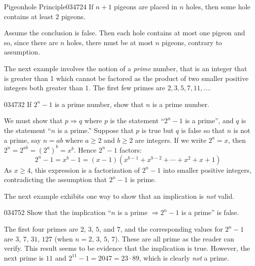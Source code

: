 \begin{example}{Pigeonhole Principle}{034724}
If $n + 1$ pigeons are placed in $n$ holes, then some hole contains at least $2$ pigeons.

\begin{solution}
  Assume the conclusion is false. Then each hole contains at most one pigeon and so, since there are $n$ holes, there must be at most $n$ pigeons, contrary to assumption.
\end{solution}
\end{example}

The next example involves the notion of a \textit{prime}
 number, that is an integer that is greater than 1 which cannot be 
factored as the product of two smaller positive integers both greater 
than $1$. The first few primes are $2, 3, 5, 7, 11, \dots$.


\begin{example}{}{034732}
If $2^n - 1$ is a prime number, show that $n$ is a prime number.


\begin{solution}
  We must show that $p \Rightarrow q$ where $p$ is the statement ``$2^n - 1$ is a prime'', and $q$ is the statement ``$n$ is a prime.'' Suppose that $p$ is true but $q$ is false so that $n$ is not a prime, say $n = ab$ where $a \geq 2$ and $b \geq 2$ are integers. If we write $2^a = x$, then $2^n = 2^{ab} = (2^a)^b = x^b$. Hence $2^n - 1$ factors:
\begin{equation*}
2^n - 1 = x^b - 1 = (x-1)(x^{b-1} +x^{b-2} + \cdots + x^2 + x + 1 )
\end{equation*}
As $x \geq 4$, this expression is a factorization of $2^n - 1$ into smaller positive integers, contradicting the assumption that $2^n - 1$ is prime.
\end{solution}
\end{example}

The next example exhibits one way to show that an implication is \textit{not} valid.


\begin{example}{}{034752}
Show that the implication ``$n$ is a prime $\Rightarrow 2^n - 1$ is a prime'' is false.


\begin{solution}
  The first four primes are $2$, $3$, $5$, and $7$, and the corresponding values for $2^n - 1$ are $3$, $7$, $31$, $127$ (when $n = 2$, $3$, $5$, $7$). These are all prime as the reader can verify. This 
result seems to be evidence that the implication is true. However, the 
next prime is $11$ and $2^{11} - 1 = 2047 = 23 \cdot 89$, which is clearly \textit{not} a prime.
\end{solution}
\end{example}

